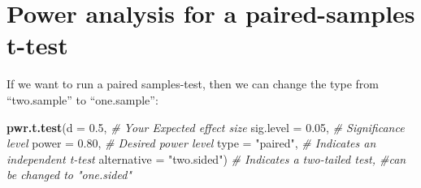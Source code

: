 \documentclass[
]{book}
\newenvironment{Shaded}{\begin{snugshade}}{\end{snugshade}}
\newcommand{\AttributeTok}[1]{\textcolor[rgb]{0.13,0.29,0.53}{#1}}
\newcommand{\CommentTok}[1]{\textcolor[rgb]{0.56,0.35,0.01}{\textit{#1}}}
\newcommand{\FloatTok}[1]{\textcolor[rgb]{0.00,0.00,0.81}{#1}}
\newcommand{\FunctionTok}[1]{\textcolor[rgb]{0.13,0.29,0.53}{\textbf{#1}}}
\newcommand{\NormalTok}[1]{#1}
\newcommand{\StringTok}[1]{\textcolor[rgb]{0.31,0.60,0.02}{#1}}
\begin{document}
\section{Power analysis for a paired-samples t-test}\label{power-analysis-for-a-paired-samples-t-test}

If we want to run a paired samples-test, then we can change the type from ``two.sample'' to ``one.sample'':

\begin{Shaded}
\begin{Highlighting}[]
\FunctionTok{pwr.t.test}\NormalTok{(}\AttributeTok{d =} \FloatTok{0.5}\NormalTok{,         }\CommentTok{\# Your Expected effect size}
           \AttributeTok{sig.level =} \FloatTok{0.05}\NormalTok{, }\CommentTok{\# Significance level}
           \AttributeTok{power =} \FloatTok{0.80}\NormalTok{,     }\CommentTok{\# Desired power level}
           \AttributeTok{type =} \StringTok{"paired"}\NormalTok{,  }\CommentTok{\# Indicates an independent t{-}test}
           \AttributeTok{alternative =} \StringTok{"two.sided"}\NormalTok{)  }\CommentTok{\# Indicates a two{-}tailed test, \#can be changed to "one.sided"}
\end{Highlighting}
\end{Shaded}


  
\end{document}
